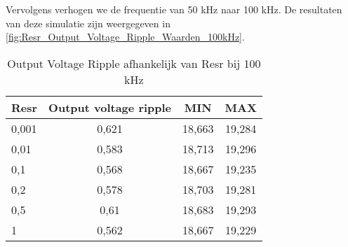 Vervolgens verhogen we de frequentie van 50 kHz naar 100 kHz. De resultaten van deze simulatie zijn weergegeven in \autoref{fig:Resr_Output_Voltage_Ripple_Waarden_100kHz}.
\begin{table}[h!]
\centering
\begin{tabular}{|l|c|c|c|}
\hline
\textbf{Resr} & \textbf{Output voltage ripple} & \textbf{MIN} & \textbf{MAX} \\
\hline
0,001  & 0,621  & 18,663  & 19,284 \\
0,01   & 0,583  & 18,713  & 19,296 \\
0,1    & 0,568  & 18,667  & 19,235 \\
0,2    & 0,578  & 18,703  & 19,281 \\
0,5    & 0,61   & 18,683  & 19,293 \\
1      & 0,562  & 18,667  & 19,229 \\
\hline
\end{tabular}
\caption{Output Voltage Ripple afhankelijk van Resr bij 100 kHz}
\label{fig:Resr_Output_Voltage_Ripple_Waarden_100kHz}
\end{table}